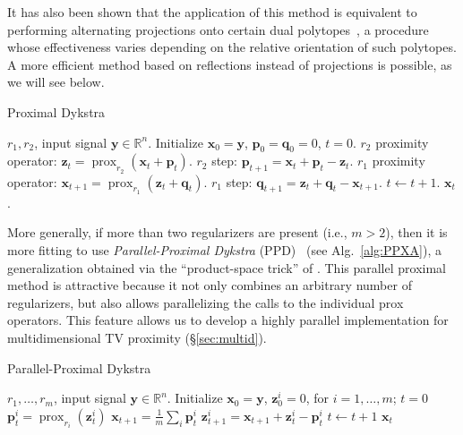 \documentclass[twoside,11pt]{article}
\newcommand{\vp}{\bm{p}}       \newcommand{\vph}{\hat{\bm{p}}}        \newcommand{\ph}{\hat{p}}    \newcommand{\vpt}{\tilde{\bm{p}}}       \newcommand{\pt}{\tilde{p}}
\newcommand{\vq}{\bm{q}}       \newcommand{\vqh}{\hat{\bm{q}}}        \newcommand{\qh}{\hat{q}}    \newcommand{\vqt}{\tilde{\bm{q}}}       \newcommand{\qt}{\tilde{q}}
\newcommand{\vx}{\bm{x}}       \newcommand{\vxh}{\hat{\bm{x}}}        \newcommand{\xh}{\hat{x}}    \newcommand{\vxt}{\tilde{\bm{x}}}       \newcommand{\xt}{\tilde{x}}
\newcommand{\vy}{\bm{y}}       \newcommand{\vyh}{\hat{\bm{y}}}        \newcommand{\yh}{\hat{y}}    \newcommand{\vyt}{\tilde{\bm{y}}}       \newcommand{\yt}{\tilde{y}}
\newcommand{\vz}{\bm{z}}       \newcommand{\vzh}{\hat{\bm{z}}}        \newcommand{\zh}{\hat{z}}    \newcommand{\vzt}{\tilde{\bm{z}}}       \newcommand{\zt}{\tilde{z}}
\DeclareMathOperator{\prox}{prox}
\newcommand{\reals}{\mathbb{R}}
\numberwithin{equation}{section}
\numberwithin{theorem}{section}
\begin{document}
It has also been shown that the application of this method is equivalent to performing alternating projections onto certain dual polytopes~\citep{jegBac13}, a procedure whose effectiveness varies depending on the relative orientation of such polytopes. A more efficient method based on reflections instead of projections is possible, as we will see below.

\begin{algorithm}
 \caption{
    \label{alg:PD}
    Proximal Dykstra
 }
 \begin{algorithmic}
   $r_1,r_2$, input signal $\vy \in \reals^n$.
  \State Initialize $\vx_0 = \vy$, $\vp_0 = \vq_0 = 0$, $t=0$.
   \State $r_2$ proximity operator: $\vz_t = \prox_{r_2} (\vx_t + \vp_t)$.
   \State $r_2$ step: $\vp_{t+1} = \vx_t + \vp_t - \vz_t$.
   \State $r_1$ proximity operator: $\vx_{t+1} = \prox_{r_1} (\vz_t + \vq_t)$.
   \State $r_1$ step: $\vq_{t+1} = \vz_t + \vq_t - \vx_{t+1}$.
   \State $t \gets t+1$.
  \EndWhile
   $\vx_t$.
 \end{algorithmic}
\end{algorithm}

More generally, if more than two regularizers are present (i.e., $m > 2$), then it is more fitting to use \emph{Parallel-Proximal Dykstra} (PPD)~\citep{ParallelDykstra} (see Alg.~\ref{alg:PPXA}), a generalization obtained via the ``product-space trick'' of \citet{pierra84}. This parallel proximal method is attractive because it not only combines an arbitrary number of regularizers, but also allows parallelizing the calls to the individual prox operators. This feature allows us to develop a highly parallel implementation for multidimensional TV proximity (\S\ref{sec:multid}).

\begin{algorithm}[t]
  \caption{\small Parallel-Proximal Dykstra}
  \label{alg:PPXA}
  \begin{algorithmic}
     $r_1, \ldots, r_m$, input signal $\vy \in \reals^n$.
    \State Initialize $\vx_0 = \vy$, $\vz_{0}^i=0$, for $i = 1, \ldots, m$; $t=0$
    \State $\vp^i_t = \prox_{r_i} (\vz^i_t)$
    \EndFor
    \State $\vx_{t+1} = \frac{1}{m}\sum_i \vp^i_t$
    \State $\vz^i_{t+1} = \vx_{t+1} + \vz^i_t - \vp^i_t$
    \EndFor
    \State $t \gets t + 1$
    \EndWhile
     $\vx_t$
  \end{algorithmic}
\end{algorithm}
\end{document}
